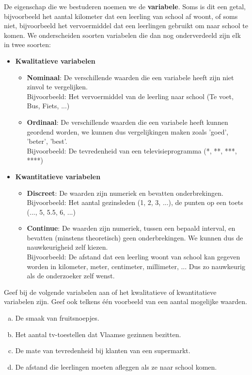 \documentclass[12pt,twoside,a4paper]{article}
\begin{document}
De eigenschap die we bestuderen noemen we de {\bf variabele}. Soms is dit een getal, bijvoorbeeld het aantal kilometer dat een leerling van school af woont, of soms niet, bijvoorbeeld het vervoermiddel dat een leerlingen gebruikt om naar school te komen. We onderscheiden soorten variabelen die dan nog onderverdeeld zijn elk in twee soorten:
\begin{itemize}
  \item {\bf Kwalitatieve variabelen}
  \begin{itemize}
    \item {\bf Nominaal}: De verschillende waarden die een variabele heeft zijn niet zinvol te vergelijken.\\
    Bijvoorbeeld: Het vervoermiddel van de leerling naar school (Te voet, Bus, Fiets, ...)
    \item {\bf Ordinaal}: De verschillende waarden die een variabele heeft kunnen geordend worden, we kunnen dus vergelijkingen maken zoals 'goed', 'beter', 'best'.\\
    Bijvoorbeeld: De tevredenheid van een televisieprogramma (*, **, ***, ****)
  \end{itemize}
  \item {\bf Kwantitatieve variabelen}
  \begin{itemize}
    \item {\bf Discreet}: De waarden zijn numeriek en bevatten onderbrekingen.\\
    Bijvoorbeeld: Het aantal gezinsleden (1, 2, 3, ...), de punten op een toets (..., 5, 5.5, 6, ...)
    \item {\bf Continue}: De waarden zijn numeriek, tussen een bepaald interval, en bevatten (minstens theoretisch) geen onderbrekingen. We kunnen dus de nauwkeurigheid zelf kiezen.\\
    Bijvoorbeeld: De afstand dat een leerling woont van school kan gegeven worden in kilometer, meter, centimeter, millimeter, ... Dus zo nauwkeurig als de onderzoeker zelf wenst.
  \end{itemize}
\end{itemize}

\begin{oefening}
Geef bij de volgende variabelen aan of het kwalitatieve of kwantitatieve variabelen zijn. Geef ook telkens één voorbeeld van een aantal mogelijke waarden.

\begin{enumerate}[(a)]
\item De smaak van fruitsnoepjes.
\item Het aantal tv-toestellen dat Vlaamse gezinnen bezitten.
\item De mate van tevredenheid bij klanten van een supermarkt.
\item De afstand die leerlingen moeten afleggen als ze naar school komen.
\end{enumerate}
\end{oefening}
\end{document}
